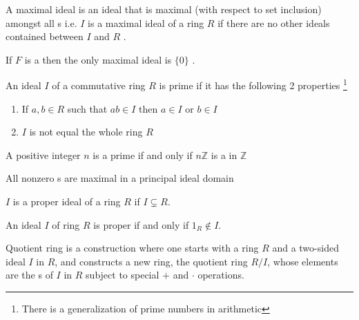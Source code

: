 \begin{appendices}
\begin{definition}
  A maximal ideal is an ideal that is maximal (with respect to set
  inclusion) amongst all s i.e.
  $I$ is a maximal ideal of a ring $R$ if there are no other ideals
  contained between $I$ and $R$ \cite{wiki:maxideal}.
\label{def:maxideal}
\end{definition}

\begin{example}
  If $F$ is a  then the only maximal ideal is
  $\{0\}$ \cite{wiki:maxideal}.
  \label{ex:maxideal}
\end{example}

\begin{definition}
  An ideal $I$ of a commutative ring $R$ is prime if it has the
  following 2 properties \cite{wiki:primeideal}
  \footnote{
    There is a generalization of prime numbers in arithmetic
  }
  \begin{enumerate}
  \item If $a,b \in R$ such that $ab \in I$ then $a \in I$ or $b \in I$
  \item$I$ is not equal the whole ring $R$
  \end{enumerate}
  \label {def:primeideal}
\end{definition}

\begin{lemma}
  A positive integer $n$ is a prime if and only if $n\mathbb{Z}$ is a
   in $\mathbb{Z}$ \cite{wiki:primeideal}
  \label{lem:primeideal_in_Z}
\end{lemma}

\begin{lemma}
  All nonzero s are maximal in a principal
  ideal domain \cite{wiki:maxideal}
  \label{lem:primeideal_is_maximal}
\end{lemma}

\begin{definition}
$I$ is a proper ideal of a ring $R$ if $I \subsetneq R$.
\label{def:properideal}
\end{definition}

\begin{theorem}
  An ideal $I$ of ring $R$ is proper if and only if $1_R \notin I$.
  \label{thm:properideal}
\end{theorem}

\begin{definition}
  Quotient ring is a construction where one
  starts with a ring $R$ and a two-sided ideal $I$ in $R$, and constructs a
  new ring, the quotient ring $R/I$, whose elements are the
  s of $I$ 
  in $R$ subject to special $+$ and $\cdot$ operations.


\end{definition}
\end{appendices}
